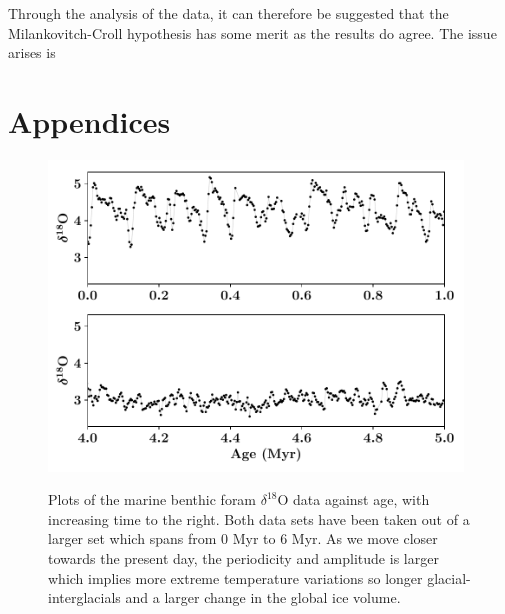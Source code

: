 \documentclass[12pt, onecolumn]{revtex4}    %
\begin{document}
Through the analysis of the data, it can therefore be suggested that the Milankovitch-Croll hypothesis has some merit as the results do agree. The issue arises is \\

\newpage





\newpage

\section*{Appendices}
\begin{figure}[!h]
\begin{center}
\includegraphics[width=11cm]{figures/foram_data}
\caption[]{Plots of the marine benthic foram $\delta^{18}$O data against age, with increasing time to the right. Both data sets have been taken out of a larger set which spans from 0 Myr to 6 Myr. As we move closer towards the present day, the periodicity and amplitude is larger which implies more extreme temperature variations so longer glacial-interglacials and a larger change in the global ice volume.}
\vspace{-3ex}
\label{fig:foram_data}
\end{center}
\end{figure}
\end{document}

